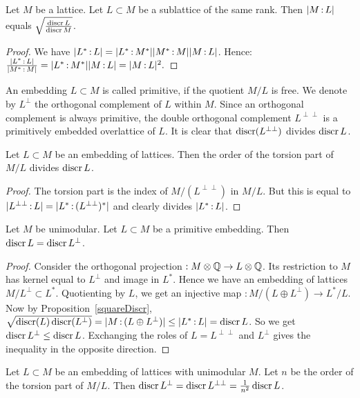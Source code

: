 \begin{proposition} \label{squareDiscr}Let $M$ be a lattice. Let $L\subset M$ be a sublattice of the same rank. Then $|M\,{:}\, L|$ equals $\sqrt{\frac{\operatorname{discr} L}{\operatorname{discr} M}}$.
\end{proposition}
\begin{proof}
We have $|L^*\,{:}\, L|=|L^*\,{:}\, M^*||M^*\,{:}\, M||M\,{:}\, L|$. Hence:
$\frac{|L^*\,{:}\, L|}{|M^*\,{:}\, M|}=|L^*\,{:}\, M^*||M\,{:}\, L|=|M\,{:}\, L|^2.$
\end{proof}
An embedding $L\subset M$ is called primitive, if the quotient $M/L$ is free. We denote by $L^\perp$ the orthogonal complement of $L$ within $M$. Since an orthogonal complement is always primitive, the double orthogonal complement $ L^{\perp\perp}$ is a primitively embedded overlattice of $L$. It is clear that $\operatorname{discr}( L^{\perp\perp})$ divides $\operatorname{discr} L$. 
\begin{proposition}\label{TorsionQuotient} Let $L\subset M$ be an embedding of lattices. Then the order of the torsion part of $M/L$ 
divides $\operatorname{discr} L$.
\end{proposition}
\begin{proof}
The torsion part is the index of $M/( L^{\perp\perp})$ in $M/L$. But this is equal to $|L^{\perp\perp}\,{:}\, L| = |L^* \,{:}\, (L^{\perp\perp})^*|$ and clearly divides $|L^*\,{:}\, L|$.
\end{proof}
\begin{proposition}\label{discrOrthPrim}
Let $M$ be unimodular. Let $L\subset M$ be a primitive embedding. Then $\operatorname{discr} L = \operatorname{discr} L^\perp$.
\end{proposition}
\begin{proof}
Consider the orthogonal projection $ : M\otimes\mathbb{Q} \rightarrow L\otimes \mathbb{Q}$. Its restriction to $M$ has kernel equal to $L^\perp$ and image in $L^*$. Hence we have an embedding of lattices $M/L^\perp \subset L^*$. Quotienting by $L$, we get an injective map $: M/(L\oplus L^\perp) \rightarrow L^*/L$. 
Now by Proposition~\ref{squareDiscr}, $\sqrt{\operatorname{discr}(L) \operatorname{discr} (L^\perp)} =|M \,{:}\, (L\oplus L^\perp)| \leq |L^*\,{:}\, L| = \operatorname{discr} L$. So we get $\operatorname{discr} L^\perp \leq \operatorname{discr} L$. Exchanging the roles of $L=L^{\perp\perp}$ and $L^\perp$ gives the inequality in the opposite direction.
\end{proof}
\begin{corollary}\label{latticeCor}
Let $L\subset M$ be an embedding of lattices with unimodular $M$. Let $n$ be the order of the torsion part of $M/L$. Then $\operatorname{discr} L^\perp =\operatorname{discr} L^{\perp\perp} = \frac{1}{n^2}\operatorname{discr} L$.
\end{corollary}

